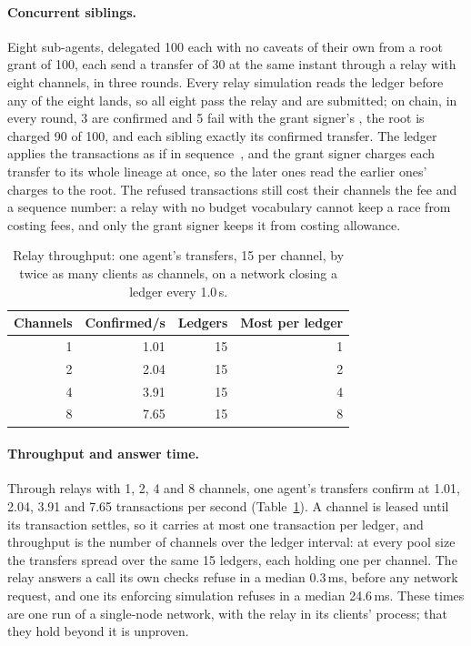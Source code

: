 \paragraph{Concurrent siblings.} Eight sub-agents, delegated 100 each with no
caveats of their own from a root grant of 100, each send a transfer of 30 at
the same instant through a relay with eight channels, in three rounds. Every
relay simulation reads the ledger before any of the eight lands, so all eight
pass the relay and are submitted; on chain, in every round, 3 are confirmed
and 5 fail with the grant signer's , the root is charged 90 of
100, and each sibling exactly its confirmed transfer.
The ledger applies the transactions as if in sequence~\cite{cap63}, and the
grant signer charges each transfer to its whole lineage at once, so the later
ones read the earlier ones' charges to the root. The refused transactions
still cost their channels the fee and a sequence number: a relay with no budget
vocabulary cannot keep a race from costing fees, and only the grant signer
keeps it from costing allowance.

\begin{table}[t]
\caption{Relay throughput: one agent's transfers, 15 per channel, by twice as
many clients as channels, on a network closing a ledger every
1.0\,s.}\label{tab:throughput}
\small
\begin{tabular}{@{}rrrr@{}}
\toprule
\textbf{Channels} & \textbf{Confirmed/s} & \textbf{Ledgers} & \textbf{Most per ledger} \\
\midrule
1 & 1.01 & 15 & 1 \\
2 & 2.04 & 15 & 2 \\
4 & 3.91 & 15 & 4 \\
8 & 7.65 & 15 & 8 \\
\bottomrule
\end{tabular}
\end{table}

\paragraph{Throughput and answer time.} Through relays with 1, 2, 4 and 8
channels, one agent's transfers confirm at 1.01, 2.04, 3.91 and 7.65
transactions per second (Table~\ref{tab:throughput}).
A channel is leased until its transaction settles, so it carries at most one
transaction per ledger, and throughput is the number of channels over the
ledger interval: at every pool size the transfers spread over the same 15
ledgers, each holding one per channel. The relay answers a call its own checks
refuse in a median 0.3\,ms, before any network request, and one its enforcing
simulation refuses in a median 24.6\,ms. These times
are one run of a single-node network, with the relay in its clients'
process; that they hold beyond it is unproven.

